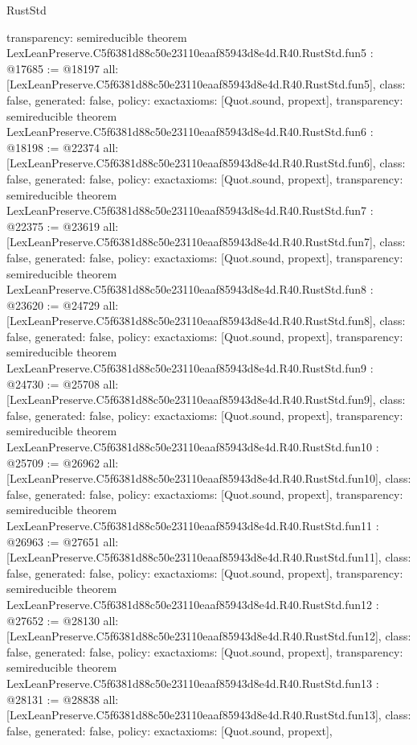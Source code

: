 \begin{lexlean}{RustStd}
\begin{coremodule}
{  transparency: semireducible
}
theorem LexLeanPreserve.C5f6381d88c50e23110eaaf85943d8e4d.R40.RustStd.fun5 : @17685 := @18197 {
  all: [LexLeanPreserve.C5f6381d88c50e23110eaaf85943d8e4d.R40.RustStd.fun5],
  class: false,
  generated: false,
  policy: exact{axioms: [Quot.sound, propext]},
  transparency: semireducible
}
theorem LexLeanPreserve.C5f6381d88c50e23110eaaf85943d8e4d.R40.RustStd.fun6 : @18198 := @22374 {
  all: [LexLeanPreserve.C5f6381d88c50e23110eaaf85943d8e4d.R40.RustStd.fun6],
  class: false,
  generated: false,
  policy: exact{axioms: [Quot.sound, propext]},
  transparency: semireducible
}
theorem LexLeanPreserve.C5f6381d88c50e23110eaaf85943d8e4d.R40.RustStd.fun7 : @22375 := @23619 {
  all: [LexLeanPreserve.C5f6381d88c50e23110eaaf85943d8e4d.R40.RustStd.fun7],
  class: false,
  generated: false,
  policy: exact{axioms: [Quot.sound, propext]},
  transparency: semireducible
}
theorem LexLeanPreserve.C5f6381d88c50e23110eaaf85943d8e4d.R40.RustStd.fun8 : @23620 := @24729 {
  all: [LexLeanPreserve.C5f6381d88c50e23110eaaf85943d8e4d.R40.RustStd.fun8],
  class: false,
  generated: false,
  policy: exact{axioms: [Quot.sound, propext]},
  transparency: semireducible
}
theorem LexLeanPreserve.C5f6381d88c50e23110eaaf85943d8e4d.R40.RustStd.fun9 : @24730 := @25708 {
  all: [LexLeanPreserve.C5f6381d88c50e23110eaaf85943d8e4d.R40.RustStd.fun9],
  class: false,
  generated: false,
  policy: exact{axioms: [Quot.sound, propext]},
  transparency: semireducible
}
theorem LexLeanPreserve.C5f6381d88c50e23110eaaf85943d8e4d.R40.RustStd.fun10 : @25709 := @26962 {
  all: [LexLeanPreserve.C5f6381d88c50e23110eaaf85943d8e4d.R40.RustStd.fun10],
  class: false,
  generated: false,
  policy: exact{axioms: [Quot.sound, propext]},
  transparency: semireducible
}
theorem LexLeanPreserve.C5f6381d88c50e23110eaaf85943d8e4d.R40.RustStd.fun11 : @26963 := @27651 {
  all: [LexLeanPreserve.C5f6381d88c50e23110eaaf85943d8e4d.R40.RustStd.fun11],
  class: false,
  generated: false,
  policy: exact{axioms: [Quot.sound, propext]},
  transparency: semireducible
}
theorem LexLeanPreserve.C5f6381d88c50e23110eaaf85943d8e4d.R40.RustStd.fun12 : @27652 := @28130 {
  all: [LexLeanPreserve.C5f6381d88c50e23110eaaf85943d8e4d.R40.RustStd.fun12],
  class: false,
  generated: false,
  policy: exact{axioms: [Quot.sound, propext]},
  transparency: semireducible
}
theorem LexLeanPreserve.C5f6381d88c50e23110eaaf85943d8e4d.R40.RustStd.fun13 : @28131 := @28838 {
  all: [LexLeanPreserve.C5f6381d88c50e23110eaaf85943d8e4d.R40.RustStd.fun13],
  class: false,
  generated: false,
  policy: exact{axioms: [Quot.sound, propext]},
}
\end{coremodule}
\end{lexlean}
